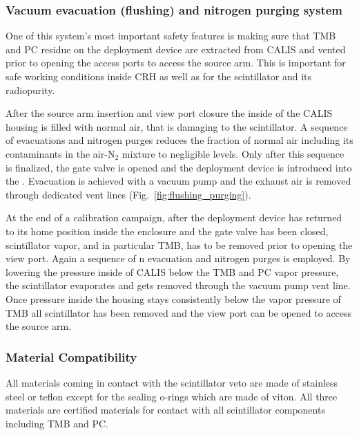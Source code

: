 \subsubsection*{Vacuum evacuation (flushing) and nitrogen purging system}\label{sec:EvacPurge}
One of this system's most important safety features is making sure that TMB and PC residue on the deployment device are extracted from CALIS and vented prior to opening the access ports to access the source arm. This is  important for safe working conditions inside CRH as well as for the scintillator and its radiopurity. 

After the source arm insertion and view port closure the inside of the CALIS housing is filled with normal air, that is damaging to the scintillator. A sequence of evacuations and nitrogen purges reduces the fraction of normal air including its contaminants in the air-N$_2$ mixture to negligible levels. Only after this sequence is finalized, the gate valve is opened and the deployment device is introduced into the \lsv. Evacuation is achieved with a vacuum pump and the exhaust air is removed through dedicated vent lines (Fig.~\ref{fig:flushing_purging}).

At the end of a calibration campaign, after the deployment device has returned to its home position inside the enclosure and the gate valve has been closed, scintillator vapor, and in particular TMB, has to be removed prior to opening the view port. Again a sequence of n evacuation and nitrogen purges is employed. By lowering the pressure inside of CALIS below the TMB and PC vapor pressure, the scintillator evaporates and gets removed through the vacuum pump vent line. Once pressure inside the housing stays consistently below the vapor pressure of TMB all scintillator has been removed and the view port can be opened to access the source arm.
 

\subsubsection*{Material Compatibility}
All materials coming in contact with the scintillator veto are made of stainless steel or teflon except for the sealing o-rings which are made of viton.  All three materials are certified materials for contact with all scintillator components including TMB and PC.

